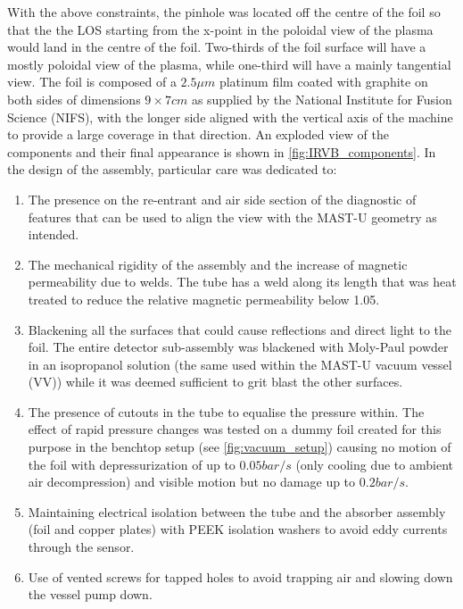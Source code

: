 With the above constraints, the pinhole was located off the centre of the foil so that the the LOS starting from the x-point in the poloidal view of the plasma would land in the centre of the foil. Two-thirds of the foil surface will have a mostly poloidal view of the plasma, while one-third will have a mainly tangential view. The foil is composed of a $2.5\mu m$ platinum film coated with graphite on both sides of dimensions ${9\times7cm}$ as supplied by the National Institute for Fusion Science (NIFS), with the longer side aligned with the vertical axis of the machine to provide a large coverage in that direction. An exploded view of the components and their final appearance is shown in \autoref{fig:IRVB_components}.
In the design of the assembly, particular care was dedicated to:
\begin{enumerate}
    \item The presence on the re-entrant and air side section of the diagnostic of features that can be used to align the view with the MAST-U geometry as intended.
    \item The mechanical rigidity of the assembly and the increase of magnetic permeability due to welds. The tube has a weld along its length that was heat treated to reduce the relative magnetic permeability below 1.05.
    \item Blackening all the surfaces that could cause reflections and direct light to the foil. The entire detector sub-assembly was blackened with Moly-Paul powder in an isopropanol solution (the same used within the MAST-U vacuum vessel (VV)) while it was deemed sufficient to grit blast the other surfaces.
    \item The presence of cutouts in the tube to equalise the pressure within. The effect of rapid pressure changes was tested on a dummy foil created for this purpose in the benchtop setup (see \autoref{fig:vacuum_setup}) causing no motion of the foil with depressurization of up to $0.05bar/s$ (only cooling due to ambient air decompression) and visible motion but no damage up to $0.2bar/s$.
    \item Maintaining electrical isolation between the tube and the absorber assembly (foil and copper plates) with PEEK isolation washers to avoid eddy currents through the sensor.
    \item Use of vented screws for tapped holes to avoid trapping air and slowing down the vessel pump down.
\end{enumerate}

